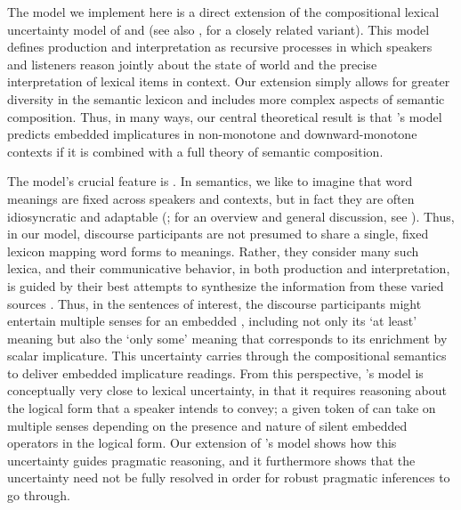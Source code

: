 \documentclass[leqno,12pt]{article}
\begin{document}
The model we implement here is a direct extension of the compositional
lexical uncertainty model of \citet{Bergen:Goodman:Levy:2012} and
\citet{Bergen:Levy:Goodman:2014} (see also
\citealp{lassiter-goodman:2013SALT,lassitergoodman15}, for a closely related
variant). This model defines production and
interpretation as recursive processes in which speakers and listeners
reason jointly about the state of world and the precise interpretation
of lexical items in context.  Our extension simply allows for greater
diversity in the semantic lexicon and includes more complex aspects of
semantic composition. Thus, in many ways, our central theoretical
result is that \citeauthor{Bergen:Levy:Goodman:2014}'s model predicts
embedded implicatures in non-monotone and downward-monotone contexts
if it is combined with a full theory of semantic composition.


The model's crucial feature is .  In
semantics, we like to imagine that word meanings are fixed across
speakers and contexts, but in fact they are often idiosyncratic and
adaptable
(\citealt{clark-clark79,Clark97,Lascarides:Copestake:1998,Glucksberg:2001};
for an overview and general discussion, see
\citealt{Wilson:Carston:2007}).  Thus, in our model, discourse
participants are not presumed to share a single, fixed lexicon mapping
word forms to meanings. Rather, they consider many such lexica, and
their communicative behavior, in both production and interpretation,
is guided by their best attempts to synthesize the information from
these varied sources \citep{Giles:Coupland:Coupland:1991}. Thus, in
the sentences of interest, the discourse participants might entertain
multiple senses for an embedded , including not only its
`at least' meaning but also the `only some' meaning that corresponds
to its enrichment by scalar implicature. This uncertainty carries
through the compositional semantics to deliver embedded implicature
readings. From this perspective, \citeauthor{ChierchiaFoxSpector08}'s
model is conceptually very close to lexical uncertainty, in that it
requires reasoning about the logical form that a speaker intends to
convey; a given token of  can take on multiple senses
depending on the presence and nature of silent embedded operators in
the logical form. Our extension of
\citeauthor{Bergen:Levy:Goodman:2014}'s model shows how this
uncertainty guides pragmatic reasoning, and it furthermore shows that
the uncertainty need not be fully resolved in order for robust
pragmatic inferences to go through.
\end{document}
